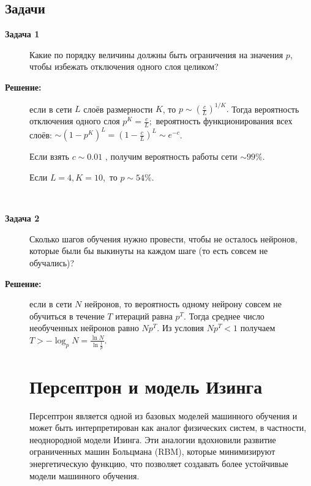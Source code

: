 \subsection{Задачи}
\begin{description}
	\item[\textbf{Задача 1}]
	      Какие по порядку величины должны быть ограничения на значения $p$, чтобы избежать отключения одного слоя целиком?
	\item[\textbf{Решение:}] если в сети $L$ слоёв размерности $K$, то $p \sim (\frac{c}{L})^{1/K}. $
	      Тогда вероятность отключения одного слоя $p^K = \frac{c}{L}; $ вероятность функционирования всех слоёв: $\sim (1-p^K)^L = (1-\frac{c}{L})^L \sim e^{-c}$.

	      Если взять $c\sim 0.01$ , получим вероятность работы сети $\sim 99\%$.

	      Если $L=4, K=10,$ то $p \sim 54\%$.

	      \

	\item[\textbf{Задача 2}]
	      Сколько шагов обучения нужно провести, чтобы не осталось нейронов, которые были бы выкинуты на каждом шаге (то есть совсем не обучались)?

	\item[\textbf{Решение:}] если в сети $N$ нейронов, то вероятность одному нейрону совсем не обучиться в течение $T$ итераций равна $p^T$. Тогда среднее число необученных нейронов равно $Np^T$. Из условия $Np^T<1$ получаем $T>-\log_{p}N = \frac{\ln N}{\ln \frac{1}{p}}$.



	      \section{Персептрон и модель Изинга}

	      Персептрон является одной из базовых моделей машинного обучения и может быть интерпретирован как аналог физических систем, в частности, неоднородной модели Изинга.
	      Эти аналогии вдохновили развитие ограниченных машин Больцмана (RBM), которые минимизируют энергетическую функцию, что позволяет создавать более устойчивые модели машинного обучения.


\end{description}
